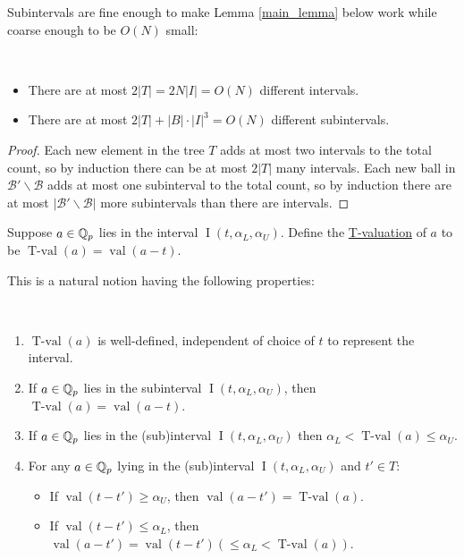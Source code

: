 \documentclass{amsart}
\newcommand{\BB}{\mathscr B}
\newcommand{\paren}[1]{\left(#1\right)}
\DeclareMathOperator{\vval}{val}
\DeclareMathOperator{\tval}{T-val}
\DeclareMathOperator{\inti}{I}
\newcommand{\defn}{\underline}
\newcommand{\interval}{\inti(t, \alpha_L, \alpha_U)}
\begin{document}
Subintervals are fine enough to make Lemma \ref{main_lemma} below work while coarse enough to be $O(N)$ small:
\begin{Lemma} \label{interval_count}\ 
  \begin{itemize}
  \item 
    There are at most $2|T| = 2 N |I| = O(N)$ different intervals.
  \item 
    There are at most $2|T| + |B| \cdot |I|^3 = O(N)$ different subintervals.
  \end{itemize}
\end{Lemma}

\begin{proof}
  Each new element in the tree $T$ adds at most two intervals to the total count,
  so by induction there can be at most $2|T|$ many intervals.
  Each new ball in $\BB' \backslash \BB$ adds at most one subinterval to the total count,
  so by induction there are at most $|\BB' \backslash \BB|$ more subintervals than there are intervals.
\end{proof}


\begin{Definition}
  Suppose $a \in \mathbb{Q}_p$ lies in the interval $\interval$. 
  Define the \defn{T-valuation} of $a$ to be $\tval(a) = \vval(a - t)$.    
\end{Definition}

This is a natural notion having the following properties:
\begin{Lemma}  \label{tval} \ 
  \begin{enumerate}[label=(\alph*)]
  \item $\tval(a)$ is well-defined, independent of choice of $t$ to represent the interval.
  \item If $a \in \mathbb{Q}_p$ lies in the subinterval $\interval$,
    then $\tval(a) = \vval(a - t)$.
  \item If $a \in \mathbb{Q}_p$ lies in the (sub)interval $\interval$ 
    then $\alpha_L < \tval(a) \leq \alpha_U$.
  \item For any $a \in \mathbb{Q}_p$ lying in the (sub)interval $\interval$ and $t' \in T$:
    \begin{itemize}
    \item If $\vval(t - t') \geq \alpha_U$, then $\vval(a - t') = \tval(a)$. 
    \item If $\vval(t - t') \leq \alpha_L$, then $\vval(a - t') = \vval(t - t') \paren{\leq \alpha_L < \tval(a)}$. 
    \end{itemize}
  \end{enumerate}
\end{Lemma}
\end{document}
